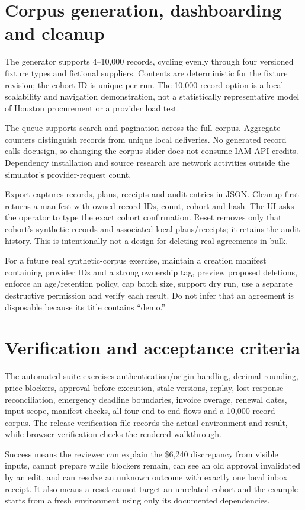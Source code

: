 \documentclass[11pt,letterpaper]{article}
\begin{document}
\section{Corpus generation, dashboarding and cleanup}
The generator supports 4--10,000 records, cycling evenly through four versioned fixture types and fictional suppliers. Contents are deterministic for the fixture revision; the cohort ID is unique per run. The 10,000-record option is a local scalability and navigation demonstration, not a statistically representative model of Houston procurement or a provider load test.

The queue supports search and pagination across the full corpus. Aggregate counters distinguish records from unique local deliveries. No generated record calls docusign, so changing the corpus slider does not consume IAM API credits. Dependency installation and source research are network activities outside the simulator's provider-request count.

Export captures records, plans, receipts and audit entries in JSON. Cleanup first returns a manifest with owned record IDs, count, cohort and hash. The UI asks the operator to type the exact cohort confirmation. Reset removes only that cohort's synthetic records and associated local plans/receipts; it retains the audit history. This is intentionally not a design for deleting real agreements in bulk.

For a future real synthetic-corpus exercise, maintain a creation manifest containing provider IDs and a strong ownership tag, preview proposed deletions, enforce an age/retention policy, cap batch size, support dry run, use a separate destructive permission and verify each result. Do not infer that an agreement is disposable because its title contains ``demo.''

\section{Verification and acceptance criteria}
The automated suite exercises authentication/origin handling, decimal rounding, price blockers, approval-before-execution, stale versions, replay, lost-response reconciliation, emergency deadline boundaries, invoice overage, renewal dates, input scope, manifest checks, all four end-to-end flows and a 10,000-record corpus. The release verification file records the actual environment and result, while browser verification checks the rendered walkthrough.

Success means the reviewer can explain the \$6,240 discrepancy from visible inputs, cannot prepare while blockers remain, can see an old approval invalidated by an edit, and can resolve an unknown outcome with exactly one local inbox receipt. It also means a reset cannot target an unrelated cohort and the example starts from a fresh environment using only its documented dependencies.
\end{document}
